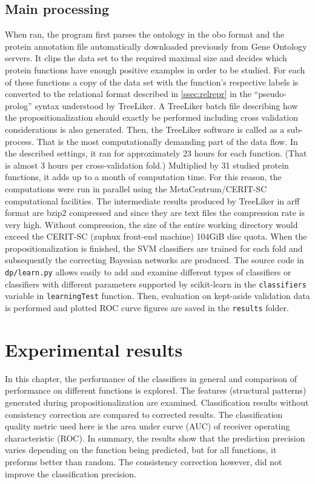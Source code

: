 \documentclass[11pt,twoside,a4paper]{book}
\begin{document}
\section{Main processing}
When ran, the program first parses the ontology in the obo format and the protein annotation file
automatically downloaded previously from Gene Ontology servers.
It clips the data set to the required maximal size and decides which
protein functions have enough positive examples in order to be studied.
For each of these functions a copy of the data set 
with the function's respective labels is
converted to the 
relational format described in \ref{ssec:relrepr} in the ``pseudo-prolog''
syntax understood by TreeLiker.
A TreeLiker batch file describing how the propositionalization
should exactly be performed including cross validation considerations
is also generated.
Then, the TreeLiker software is called as a sub-process.
That is the most computationally demanding part of the data flow.
In the described settings, it ran for approximately 23 hours for each function.
(That is almost 3 hours per cross-validation fold.)
Multiplied by 31 studied protein functions, it adds up to a month of computation time.
For this reason, the computations were run in parallel 
using the MetaCentrum/CERIT-SC computational facilities.
The intermediate results produced by TreeLiker in arff format are bzip2 compressed
and since they are text files the compression rate is very high. 
Without compression, the size of the entire working directory
would exceed the CERIT-SC (zuphux front-end machine) 104GiB disc quota.
When the propositionalization is finished,
the SVM classifiers are trained for each fold
and subsequently the correcting Bayesian networks are produced.
The source code in \texttt{dp/learn.py}
allows easily to add and examine different types of classifiers 
or classifiers with different parameters supported 
by scikit-learn in the \texttt{classifiers} variable
in \texttt{learningTest} function.
Then, evaluation on kept-aside validation data is performed
and plotted ROC curve figures are saved
in the \texttt{results} folder.


\chapter{Experimental results}
\label{ch:results}

In this chapter, 
the performance of the classifiers in 
general and comparison of performance on different functions
is explored. 
The features (structural patterns) generated during propositionalization are examined.
Classification results without consistency correction are compared to
corrected results.
The classification quality metric used here is the area under curve (AUC)
of receiver operating characteristic (ROC).
In summary, the results show that
the prediction precision varies depending on the function being predicted,
but for all functions, it preforms better than random. 
The consistency correction however, did not improve the classification precision.
\end{document}
